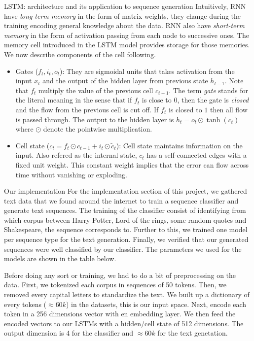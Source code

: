 \documentclass[final]{beamer}
\newlength{\colwidth}
\begin{document}
\begin{frame}[t]
\begin{columns}[t]
\begin{column}{\colwidth}
\begin{block}{LSTM: architecture and its application to sequence generation}
Intuitively, RNN have \textit{long-term memory} in the form of matrix weights,
they change during the training encoding general knowledge about the data. RNN
also have \textit{short-term memory} in the form of activation passing from
each node to successive ones. The memory cell introduced in the LSTM model
provides storage for those memories. We now describe components of the cell
following.\cite{review}

\begin{center}
    \begin{itemize}
    \item Gates ($f_t, i_t, o_t$): They are sigmoidal units that takes
      activation from the input $x_t$ and the output of the hidden layer from
      previous state $h_{t-1}$. Note that $f_t$ multiply the value of the
      previous cell $c_{t-1}$. The term \textit{gate} stands for the literal
      meaning in the sense that if $f_{t}$ is close to $0$, then the gate is
      \textit{closed} and the flow from the previous cell is cut off. If $f_t$
      is closed to $1$ then all flow is passed through. The output to the
      hidden layer is $h_t = o_t \odot \tanh(c_t)$ where $\odot$ denote the
      pointwise multiplication.
    \item Cell state ($c_t = f_t \odot c_{t-1} + i_t \odot \tilde{c}_t$): Cell
    state maintains information on the input. Also refered as the internal state,
    $c_t$ has a self-connected edges with a fixed unit weight. This constant
    weight implies that the error can flow across time without vanishing or
    exploding. 
\end{itemize}
\end{center}

\end{block}

\begin{block}{Our implementation}
For the implementation section of this project, we gathered text data that we
found around the internet to train a sequence classifier and generate text
sequences. The training of the classifier consist of identifying from which
corpus between Harry Potter, Lord of the rings, some random quotes and
Shakespeare, the sequence corresponds to. Further to this, we trained one model
per sequence type for the text generation. Finally, we verified that our
generated sequences were well classified by our classifier. The parameters we
used for the models are shown in the table below. 

Before doing any sort or training, we had to do a bit of preprocessing on the
data. First, we tokenized each corpus in sequences of 50 tokens. Then, we
removed every capital letters to standardize the text. We built up a dictionary
of every tokens ($\approx 60k$) in the datasets, this is our input space. Next,
encode each token in a 256 dimensions vector with en embedding layer. We then
feed the encoded vectors to our LSTMs with a hidden/cell state of 512
dimensions. The output dimension is 4 for the classifier and $\approx 60k$ for
the text genetation. 


\end{block}
\end{column}
\end{columns}
\end{frame}
\end{document}
